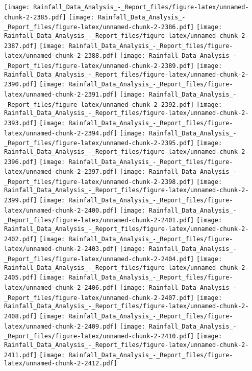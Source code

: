 \documentclass[
]{article}
\begin{document}
\texttt{[image: Rainfall\_Data\_Analysis\_-\_Report\_files/figure-latex/unnamed-chunk-2-2385.pdf]}
\texttt{[image: Rainfall\_Data\_Analysis\_-\_Report\_files/figure-latex/unnamed-chunk-2-2386.pdf]}
\texttt{[image: Rainfall\_Data\_Analysis\_-\_Report\_files/figure-latex/unnamed-chunk-2-2387.pdf]}
\texttt{[image: Rainfall\_Data\_Analysis\_-\_Report\_files/figure-latex/unnamed-chunk-2-2388.pdf]}
\texttt{[image: Rainfall\_Data\_Analysis\_-\_Report\_files/figure-latex/unnamed-chunk-2-2389.pdf]}
\texttt{[image: Rainfall\_Data\_Analysis\_-\_Report\_files/figure-latex/unnamed-chunk-2-2390.pdf]}
\texttt{[image: Rainfall\_Data\_Analysis\_-\_Report\_files/figure-latex/unnamed-chunk-2-2391.pdf]}
\texttt{[image: Rainfall\_Data\_Analysis\_-\_Report\_files/figure-latex/unnamed-chunk-2-2392.pdf]}
\texttt{[image: Rainfall\_Data\_Analysis\_-\_Report\_files/figure-latex/unnamed-chunk-2-2393.pdf]}
\texttt{[image: Rainfall\_Data\_Analysis\_-\_Report\_files/figure-latex/unnamed-chunk-2-2394.pdf]}
\texttt{[image: Rainfall\_Data\_Analysis\_-\_Report\_files/figure-latex/unnamed-chunk-2-2395.pdf]}
\texttt{[image: Rainfall\_Data\_Analysis\_-\_Report\_files/figure-latex/unnamed-chunk-2-2396.pdf]}
\texttt{[image: Rainfall\_Data\_Analysis\_-\_Report\_files/figure-latex/unnamed-chunk-2-2397.pdf]}
\texttt{[image: Rainfall\_Data\_Analysis\_-\_Report\_files/figure-latex/unnamed-chunk-2-2398.pdf]}
\texttt{[image: Rainfall\_Data\_Analysis\_-\_Report\_files/figure-latex/unnamed-chunk-2-2399.pdf]}
\texttt{[image: Rainfall\_Data\_Analysis\_-\_Report\_files/figure-latex/unnamed-chunk-2-2400.pdf]}
\texttt{[image: Rainfall\_Data\_Analysis\_-\_Report\_files/figure-latex/unnamed-chunk-2-2401.pdf]}
\texttt{[image: Rainfall\_Data\_Analysis\_-\_Report\_files/figure-latex/unnamed-chunk-2-2402.pdf]}
\texttt{[image: Rainfall\_Data\_Analysis\_-\_Report\_files/figure-latex/unnamed-chunk-2-2403.pdf]}
\texttt{[image: Rainfall\_Data\_Analysis\_-\_Report\_files/figure-latex/unnamed-chunk-2-2404.pdf]}
\texttt{[image: Rainfall\_Data\_Analysis\_-\_Report\_files/figure-latex/unnamed-chunk-2-2405.pdf]}
\texttt{[image: Rainfall\_Data\_Analysis\_-\_Report\_files/figure-latex/unnamed-chunk-2-2406.pdf]}
\texttt{[image: Rainfall\_Data\_Analysis\_-\_Report\_files/figure-latex/unnamed-chunk-2-2407.pdf]}
\texttt{[image: Rainfall\_Data\_Analysis\_-\_Report\_files/figure-latex/unnamed-chunk-2-2408.pdf]}
\texttt{[image: Rainfall\_Data\_Analysis\_-\_Report\_files/figure-latex/unnamed-chunk-2-2409.pdf]}
\texttt{[image: Rainfall\_Data\_Analysis\_-\_Report\_files/figure-latex/unnamed-chunk-2-2410.pdf]}
\texttt{[image: Rainfall\_Data\_Analysis\_-\_Report\_files/figure-latex/unnamed-chunk-2-2411.pdf]}
\texttt{[image: Rainfall\_Data\_Analysis\_-\_Report\_files/figure-latex/unnamed-chunk-2-2412.pdf]}
\end{document}
